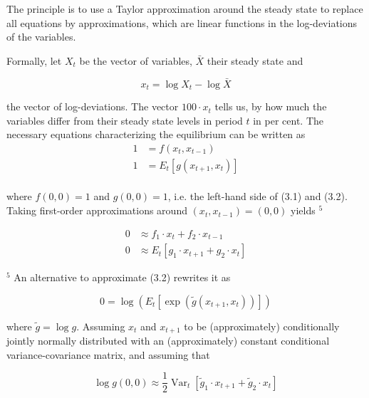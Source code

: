 \documentclass[10pt]{article}
\begin{document}
The principle is to use a Taylor approximation around the steady state to replace all equations by approximations, which are linear functions in the log-deviations of the variables.

Formally, let $X_{t}$ be the vector of variables, $\bar{X}$ their steady state and

\begin{equation*}
x_{t}=\log X_{t}-\log \bar{X}
\end{equation*}

the vector of log-deviations. The vector $100 \cdot x_{t}$ tells us, by how much the variables differ from their steady state levels in period $t$ in per cent. The necessary equations characterizing the equilibrium can be written as\\
\begin{align*}
1 & =f\left(x_{t}, x_{t-1}\right)  \tag{3.1}\\
1 & =E_{t}\left[g\left(x_{t+1}, x_{t}\right)\right] \tag{3.2}
\end{align*}\\
where $f(0,0)=1$ and $g(0,0)=1$, i.e. the left-hand side of (3.1) and (3.2). Taking first-order approximations around $\left(x_{t}, x_{t-1}\right)=(0,0)$ yields ${ }^{5}$

\begin{equation*}
\begin{aligned}
0 & \approx f_{1} \cdot x_{t}+f_{2} \cdot x_{t-1} \\
0 & \approx E_{t}\left[g_{1} \cdot x_{t+1}+g_{2} \cdot x_{t}\right]
\end{aligned}
\end{equation*}

${ }^{5}$ An alternative to approximate (3.2) rewrites it as

\begin{equation*}
0=\log \left(E_{t}\left[\exp \left(\tilde{g}\left(x_{t+1}, x_{t}\right)\right)\right]\right)
\end{equation*}

where $\tilde{g}=\log g$. Assuming $x_{t}$ and $x_{t+1}$ to be (approximately) conditionally jointly normally distributed with an (approximately) constant conditional variance-covariance matrix, and assuming that

\begin{equation*}
\log g(0,0) \approx \frac{1}{2} \operatorname{Var}_{t}\left[\tilde{g}_{1} \cdot x_{t+1}+\tilde{g}_{2} \cdot x_{t}\right] \tag{3.3}
\end{equation*}
\end{document}
